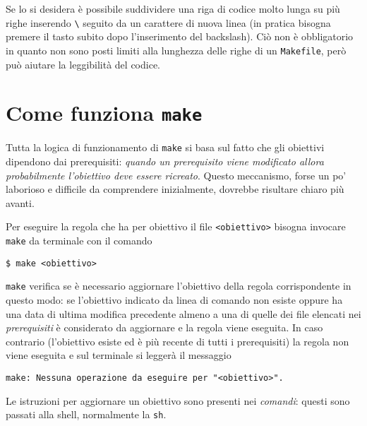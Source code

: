 Se lo si desidera è possibile suddividere una riga di codice molto lunga su più
righe inserendo \texttt{\textbackslash{}} seguito da un carattere di nuova linea
(in pratica bisogna premere il tasto  subito dopo l'inserimento del
backslash).  Ciò non è obbligatorio in quanto non sono posti limiti alla
lunghezza delle righe di un \texttt{Makefile}, però può aiutare la leggibilità
del codice.


\section{Come funziona \texttt{make}}
\label{sec:come-funziona}

Tutta la logica di funzionamento di \texttt{make} si basa sul fatto che gli
obiettivi dipendono dai prerequisiti:
\emph{quando un prerequisito viene modificato allora probabilmente l'obiettivo
  deve essere ricreato}.
Questo meccanismo, forse un po' laborioso e difficile da comprendere
inizialmente, dovrebbe risultare chiaro più avanti.

Per eseguire la regola che ha per obiettivo il file \texttt{<obiettivo>} bisogna
invocare \texttt{make} da terminale con il comando
\begin{verbatim}
$ make <obiettivo>
\end{verbatim} %
\texttt{make} verifica se è necessario aggiornare l'obiettivo della regola
corrispondente in questo modo: se l'obiettivo indicato da linea di comando non
esiste oppure ha una data di ultima modifica precedente almeno a una di quelle
dei file elencati nei \emph{prerequisiti} è considerato da aggiornare e la
regola viene eseguita.  In caso contrario (l'obiettivo esiste ed è più recente
di tutti i prerequisiti) la regola non viene eseguita e sul terminale si leggerà
il messaggio
\begin{verbatim}
make: Nessuna operazione da eseguire per "<obiettivo>".
\end{verbatim}
Le istruzioni per aggiornare un obiettivo sono
presenti nei \emph{comandi}: questi sono passati alla shell, normalmente la
\texttt{sh}.

